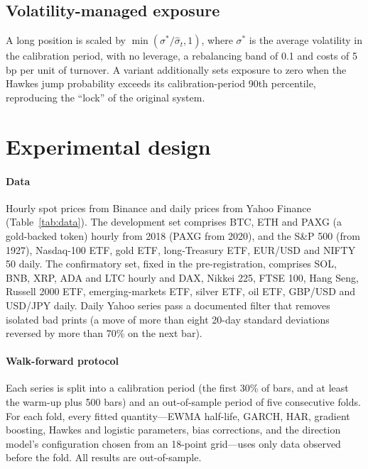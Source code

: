 \documentclass[preprint,12pt,authoryear]{elsarticle}
\begin{document}
\subsection{Volatility-managed exposure}
A long position is scaled by $\min(\sigma^\ast/\hat\sigma_{t},1)$, where $\sigma^\ast$ is the average
volatility in the calibration period, with no leverage, a rebalancing band of 0.1 and costs of
5\,bp per unit of turnover. A variant additionally sets exposure to zero when the Hawkes jump
probability exceeds its calibration-period 90th percentile, reproducing the ``lock'' of the
original system.

\section{Experimental design}
\label{sec:design}

\paragraph{Data} Hourly spot prices from Binance and daily prices from Yahoo Finance
(Table~\ref{tab:data}). The development set comprises BTC, ETH and PAXG (a gold-backed token)
hourly from 2018 (PAXG from 2020), and the S\&P 500 (from 1927), Nasdaq-100 ETF, gold ETF,
long-Treasury ETF, EUR/USD and NIFTY 50 daily. The confirmatory set, fixed in the
pre-registration, comprises SOL, BNB, XRP, ADA and LTC hourly and DAX, Nikkei 225, FTSE 100, Hang
Seng, Russell 2000 ETF, emerging-markets ETF, silver ETF, oil ETF, GBP/USD and USD/JPY daily.
Daily Yahoo series pass a documented filter that removes isolated bad prints (a move of more
than eight 20-day standard deviations reversed by more than 70\% on the next bar).

\paragraph{Walk-forward protocol} Each series is split into a calibration period (the first 30\%
of bars, and at least the warm-up plus 500 bars) and an out-of-sample period of five consecutive
folds. For each fold, every fitted quantity---EWMA half-life, GARCH, HAR, gradient boosting,
Hawkes and logistic parameters, bias corrections, and the direction model's configuration
chosen from an 18-point grid---uses only data observed before the fold. All results are
out-of-sample.
\end{document}
